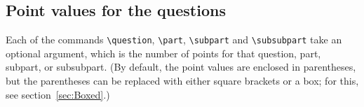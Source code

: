 \documentclass[12pt]{exam}
\begin{document}
\begin{questions}

\question
{}


\end{questions}


\subsection{Point values for the questions}
\label{sec:points}

Each of the commands \verb"\question", \verb"\part", \verb"\subpart"
and \verb"\subsubpart" take an optional argument, which is the number
of points for that question, part, subpart, or subsubpart.  (By
default, the point values are enclosed in parentheses, but the
parentheses can be replaced with either square brackets or a box; for
this, see section~\ref{sec:Boxed}.)
\end{document}

